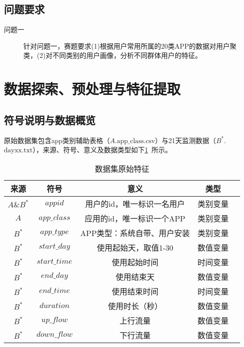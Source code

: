 \documentclass[withoutpreface,bwprint]{cumcmthesis}
\begin{document}
\subsection{问题要求}

\begin{description}
    \item[问题一] 针对问题一，赛题要求(1)根据用户常用所属的20类APP的数据对用户聚类，(2)对不同类别的用户画像，分析不同群体用户的特征。
    \item[]
\end{description}

\newpage
\section{数据探索、预处理与特征提取}

\subsection{符号说明与数据概览}

原始数据集包含app类别辅助表格（$A$.$\text{app\_class.csv}$）与21天监测数据（$B^*$.$\text{dayxx.txt}$），来源、符号、意义及数据类型如下\cref{tab:001}~所示。

\begin{table}[!htbp]
    \caption{数据集原始特征}\label{tab:001} \centering
    \begin{tabular}{ccccc}
        \toprule[1.5pt]
        来源       & 符号            & 意义              & 类型   \\
        \midrule[1pt]
        $A\&B^*$ & $appid$       & 用户的id，唯一标识一名用户  & 类别变量 \\
        $A$      & $app\_class$  & 应用的id，唯一标识一个APP & 类别变量 \\
        $B^*$    & $app\_type$   & APP类型：系统自带、用户安装 & 类别变量 \\
        $B^*$    & $start\_day$  & 使用起始天，取值1-30    & 数值变量 \\
        $B^*$    & $start\_time$ & 使用起始时间          & 时间变量 \\
        $B^*$    & $end\_day$    & 使用结束天           & 数值变量 \\
        $B^*$    & $end\_time$   & 使用结束时间          & 时间变量 \\
        $B^*$    & $duration$    & 使用时长（秒）         & 数值变量 \\
        $B^*$    & $up\_flow$    & 上行流量            & 数值变量 \\
        $B^*$    & $down\_flow$  & 下行流量            & 数值变量 \\
        \bottomrule[1.5pt]
    \end{tabular}
\end{table}
\end{document}
